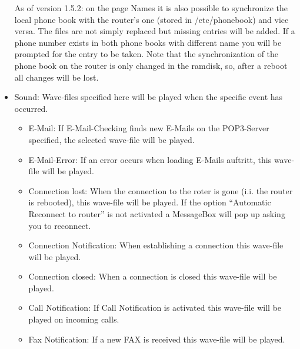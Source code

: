 \begin{itemize}
    As of version 1.5.2: on the page Names it is also possible to synchronize
    the local phone book with the router's one (stored in /etc/phonebook) and vice
    versa. The files are not simply replaced but missing entries will be added.
    If a phone number exists in both phone books with different name you will be
    prompted for the entry to be taken. Note that the synchronization of the phone
    book on the router is only changed in the ramdisk, so, after a reboot all
    changes will be lost.

  \item Sound: Wave-files specified here will be played when the specific event has occurred.
    \begin{itemize}
      \item \mbox{E-Mail}: If \mbox{E-Mail}-Checking finds new \mbox{E-Mails} on the POP3-Server
	specified, the selected wave-file will be played.
      \item \mbox{E-Mail}-Error: If an error occurs when loading \mbox{E-Mails} auftritt, this
        wave-file will be played.
      \item Connection lost: When the connection to the roter is gone (i.i. the router is rebooted),
	this wave-file will be played. If the option ``Automatic Reconnect to router'' is not
	activated a MessageBox will pop up asking you to reconnect.
      \item Connection Notification: When establishing a connection this 
        wave-file will be played.
      \item Connection closed: When a connection is closed this wave-file will be played.
      \item Call Notification: If Call Notification is activated this wave-file will be played on incoming calls.
      \item Fax Notification: If a new FAX is received this wave-file will be played.
    \end{itemize}


\end{itemize}
